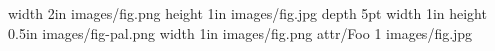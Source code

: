  
\pdfximage width 2in {images/fig.png}\edef\i{\the\pdflastximage}\pdfrefximage\i
\pdfximage height 1in {images/fig.jpg}\pdfrefximage\pdflastximage
{}\pdfrefximage\pdflastximage \message{\the\pdflastximagepages}
\pdfximage depth 5pt width 1in height 0.5in {images/fig-pal.png}\pdfrefximage\pdflastximage
\pdfximage width 1in {images/fig.png}\pdfrefximage\pdflastximage
{} \pdfrefximage\pdflastximage
\pdfximage attr{/Foo 1} {images/fig.jpg}\pdfrefximage\pdflastximage
{}\pdfrefximage\pdflastximage
\bye
